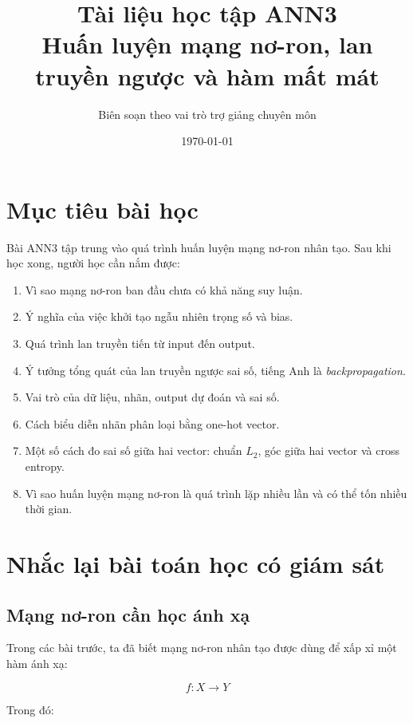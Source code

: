\documentclass[12pt,a4paper]{report}
\title{
    \textbf{Tài liệu học tập ANN3}\\
    \large Huấn luyện mạng nơ-ron, lan truyền ngược và hàm mất mát
}
\author{Biên soạn theo vai trò trợ giảng chuyên môn}
\date{\today}
\begin{document}
\maketitle
\tableofcontents
\newpage

\chapter*{Mục tiêu bài học}

Bài ANN3 tập trung vào quá trình huấn luyện mạng nơ-ron nhân tạo. Sau khi học xong, người học cần nắm được:

\begin{enumerate}[label=\arabic*.]
    \item Vì sao mạng nơ-ron ban đầu chưa có khả năng suy luận.
    \item Ý nghĩa của việc khởi tạo ngẫu nhiên trọng số và bias.
    \item Quá trình lan truyền tiến từ input đến output.
    \item Ý tưởng tổng quát của lan truyền ngược sai số, tiếng Anh là \textit{backpropagation}.
    \item Vai trò của dữ liệu, nhãn, output dự đoán và sai số.
    \item Cách biểu diễn nhãn phân loại bằng one-hot vector.
    \item Một số cách đo sai số giữa hai vector: chuẩn $L_2$, góc giữa hai vector và cross entropy.
    \item Vì sao huấn luyện mạng nơ-ron là quá trình lặp nhiều lần và có thể tốn nhiều thời gian.
\end{enumerate}

\chapter{Nhắc lại bài toán học có giám sát}

\section{Mạng nơ-ron cần học ánh xạ}

Trong các bài trước, ta đã biết mạng nơ-ron nhân tạo được dùng để xấp xỉ một hàm ánh xạ:

\[
    f: X \rightarrow Y
\]

Trong đó:
\end{document}

